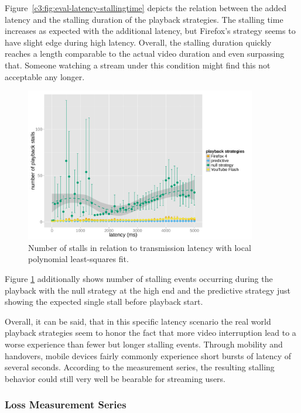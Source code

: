 Figure~\ref{c3:fig:eval-latency-stallingtime} depicts the relation between the added latency and the stalling duration of the playback strategies. The stalling time increases as expected with the additional latency, but Firefox's strategy seems to have slight edge during high latency. Overall, the stalling duration quickly reaches a length comparable to the actual video duration and even surpassing that. Someone watching a stream under this condition might find this not acceptable any longer.

\begin{figure}[htb]
	\centering
	\includegraphics[width=0.9\textwidth]{images/R-playbackemulation-stallnumber-latency.pdf}
	\caption{Number of stalls in relation to transmission latency with local polynomial least-squares fit.}
\label{c3:fig:eval-latency-numstalls}
\end{figure}

Figure \ref{c3:fig:eval-latency-numstalls} additionally shows number of stalling events occurring during the playback with the null strategy at the high end and the predictive strategy just showing the expected single stall before playback start.

Overall, it can be said, that in this specific latency scenario the real world playback strategies seem to honor the fact that more video interruption lead to a worse experience than fewer but longer stalling events. Through mobility and handovers, mobile devices fairly commonly experience short bursts of latency of several seconds. According to the measurement series, the resulting stalling behavior could still very well be bearable for streaming users.


\subsubsection{Loss Measurement Series}

